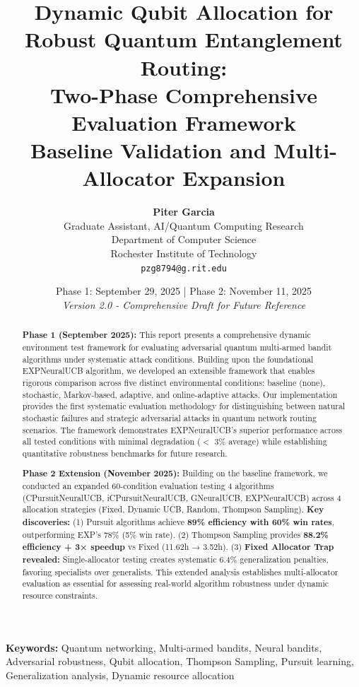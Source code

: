 \documentclass[11pt,a4paper]{article}
\title{
  \vspace{-1.5cm}
  \textbf{\LARGE Dynamic Qubit Allocation for Robust Quantum Entanglement Routing:} \\
  \vspace{0.4cm}
  \textbf{\Large Two-Phase Comprehensive Evaluation Framework} \\
  \vspace{0.6cm}
  \large Baseline Validation and Multi-Allocator Expansion
}
\author{
  \textbf{Piter Garcia} \\
  Graduate Assistant, AI/Quantum Computing Research \\
  Department of Computer Science \\
  Rochester Institute of Technology \\
  \texttt{pzg8794@g.rit.edu}
}
\date{
  Phase 1: September 29, 2025 | Phase 2: November 11, 2025 \\
  \vspace{0.3cm}
  \textit{Version 2.0 - Comprehensive Draft for Future Reference}
}
\newcommand{\success}[1]{\textcolor{successcolor}{\textbf{#1}}}
\begin{document}
\maketitle


\begin{abstract}
\textbf{Phase 1 (September 2025):} This report presents a comprehensive dynamic environment test framework for evaluating adversarial quantum multi-armed bandit algorithms under systematic attack conditions. Building upon the foundational EXPNeuralUCB algorithm, we developed an extensible framework that enables rigorous comparison across five distinct environmental conditions: baseline (none), stochastic, Markov-based, adaptive, and online-adaptive attacks. Our implementation provides the first systematic evaluation methodology for distinguishing between natural stochastic failures and strategic adversarial attacks in quantum network routing scenarios. The framework demonstrates EXPNeuralUCB's superior performance across all tested conditions with minimal degradation ($<$ 3\% average) while establishing quantitative robustness benchmarks for future research.

\textbf{Phase 2 Extension (November 2025):} Building on the baseline framework, we conducted an expanded 60-condition evaluation testing 4 algorithms (CPursuitNeuralUCB, iCPursuitNeuralUCB, GNeuralUCB, EXPNeuralUCB) across 4 allocation strategies (Fixed, Dynamic UCB, Random, Thompson Sampling). \textbf{Key discoveries:} (1) Pursuit algorithms achieve \success{89\% efficiency with 60\% win rates}, outperforming EXP's 78\% (5\% win rate). (2) Thompson Sampling provides \success{88.2\% efficiency + 3× speedup} vs Fixed (11.62h → 3.52h). (3) \textbf{Fixed Allocator Trap revealed:} Single-allocator testing creates systematic 6.4\% generalization penalties, favoring specialists over generalists. This extended analysis establishes multi-allocator evaluation as essential for assessing real-world algorithm robustness under dynamic resource constraints.
\end{abstract}

\vspace{0.3cm}
\noindent\textbf{Keywords:} Quantum networking, Multi-armed bandits, Neural bandits, Adversarial robustness, Qubit allocation, Thompson Sampling, Pursuit learning, Generalization analysis, Dynamic resource allocation
\end{document}
